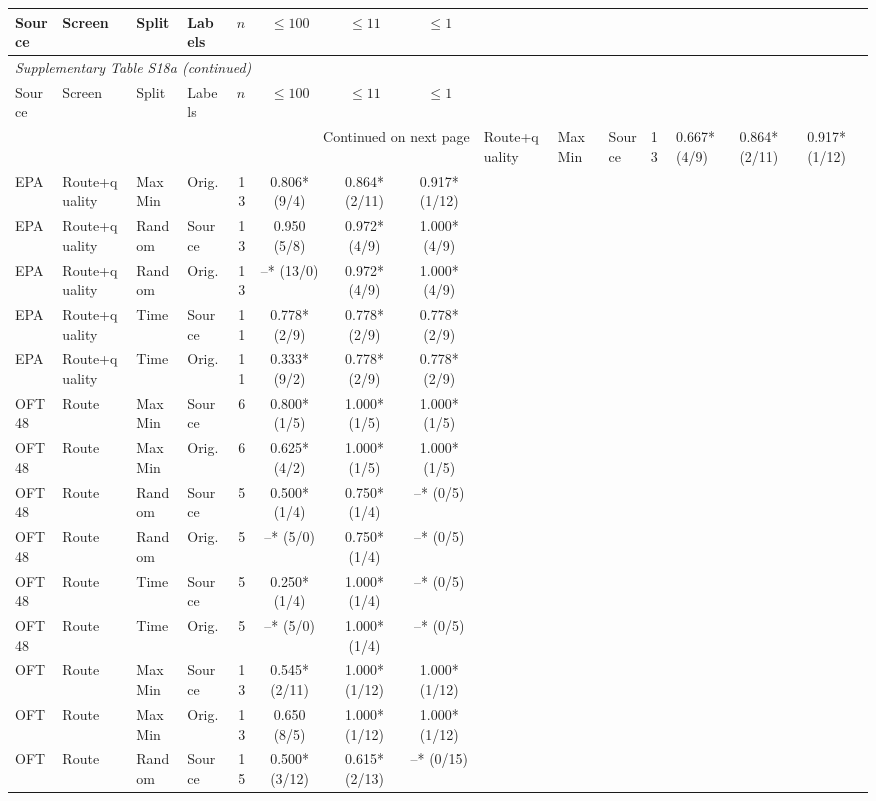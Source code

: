 \begin{longtable}{llllrccc}

\toprule Source & Screen & Split & Labels & $n$ & $\leq100$ & $\leq11$ & $\leq1$ \\ \midrule\endfirsthead

\multicolumn{8}{l}{\textit{Supplementary Table S18a (continued)}} \\

\toprule Source & Screen & Split & Labels & $n$ & $\leq100$ & $\leq11$ & $\leq1$ \\ \midrule\endhead

\midrule\multicolumn{8}{r}{Continued on next page}\endfoot\bottomrule\endlastfoot

EPA & Route+quality & MaxMin & Source & 13 & 0.667* (4/9) & 0.864* (2/11) & 0.917* (1/12) \\
EPA & Route+quality & MaxMin & Orig. & 13 & 0.806* (9/4) & 0.864* (2/11) & 0.917* (1/12) \\
EPA & Route+quality & Random & Source & 13 & 0.950 (5/8) & 0.972* (4/9) & 1.000* (4/9) \\
EPA & Route+quality & Random & Orig. & 13 & --* (13/0) & 0.972* (4/9) & 1.000* (4/9) \\
EPA & Route+quality & Time & Source & 11 & 0.778* (2/9) & 0.778* (2/9) & 0.778* (2/9) \\
EPA & Route+quality & Time & Orig. & 11 & 0.333* (9/2) & 0.778* (2/9) & 0.778* (2/9) \\
OFT48 & Route & MaxMin & Source & 6 & 0.800* (1/5) & 1.000* (1/5) & 1.000* (1/5) \\
OFT48 & Route & MaxMin & Orig. & 6 & 0.625* (4/2) & 1.000* (1/5) & 1.000* (1/5) \\
OFT48 & Route & Random & Source & 5 & 0.500* (1/4) & 0.750* (1/4) & --* (0/5) \\
OFT48 & Route & Random & Orig. & 5 & --* (5/0) & 0.750* (1/4) & --* (0/5) \\
OFT48 & Route & Time & Source & 5 & 0.250* (1/4) & 1.000* (1/4) & --* (0/5) \\
OFT48 & Route & Time & Orig. & 5 & --* (5/0) & 1.000* (1/4) & --* (0/5) \\
OFT & Route & MaxMin & Source & 13 & 0.545* (2/11) & 1.000* (1/12) & 1.000* (1/12) \\
OFT & Route & MaxMin & Orig. & 13 & 0.650 (8/5) & 1.000* (1/12) & 1.000* (1/12) \\
OFT & Route & Random & Source & 15 & 0.500* (3/12) & 0.615* (2/13) & --* (0/15) \\

\end{longtable}
